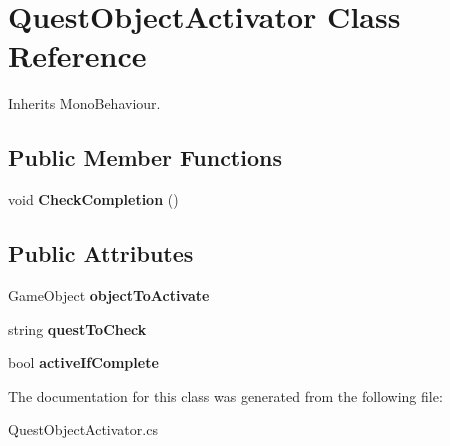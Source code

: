 \hypertarget{class_quest_object_activator}{}\section{Quest\+Object\+Activator Class Reference}
\label{class_quest_object_activator}


Inherits Mono\+Behaviour.

\subsection*{Public Member Functions}
\begin{DoxyCompactItemize}
\item 
\mbox{\label{class_quest_object_activator_a21f9d2027f4bce00ff0e3f7f2599df24}} 
void {\bfseries Check\+Completion} ()
\end{DoxyCompactItemize}
\subsection*{Public Attributes}
\begin{DoxyCompactItemize}
\item 
\mbox{\label{class_quest_object_activator_a6f0a67d2a259666286b70b27d62d0161}} 
Game\+Object {\bfseries object\+To\+Activate}
\item 
\mbox{\label{class_quest_object_activator_afae27ef01a9963da1eb4a2630faf936a}} 
string {\bfseries quest\+To\+Check}
\item 
\mbox{\label{class_quest_object_activator_aea98627cba1339f3a7c8c2e44efc3321}} 
bool {\bfseries active\+If\+Complete}
\end{DoxyCompactItemize}


The documentation for this class was generated from the following file\+:\begin{DoxyCompactItemize}
\item 
Quest\+Object\+Activator.\+cs\end{DoxyCompactItemize}
